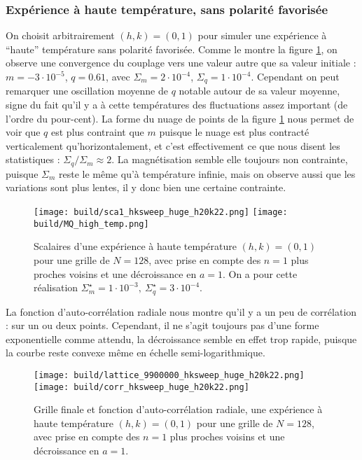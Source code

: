 \documentclass[a4paper, 11pt]{article}
\begin{document}
\subsubsection{Expérience à haute température, sans polarité favorisée }

On choisit arbitrairement $(h, k) = (0, 1)$ pour simuler une expérience à ``haute'' température sans
polarité favorisée. Comme le montre la figure \ref{fig:high_en_sca}, on observe une convergence du
couplage vers une valeur autre que sa valeur initiale : $m = -3\cdot10^{-5}$, $q=0.61$, avec $\Sigma_m
= 2\cdot10^{-4}$, $\Sigma_q = 1\cdot10^{-4}$. Cependant on peut remarquer une oscillation moyenne de $q$
notable autour de sa valeur moyenne, signe du fait qu'il y a à cette températures des fluctuations
assez important (de l'ordre du pour-cent). La forme du nuage de points de la figure
\ref{fig:high_en_sca} nous permet de voir que $q$ est plus contraint que $m$ puisque le nuage est
plus contracté verticalement qu'horizontalement, et c'est effectivement ce que nous disent les
statistiques : $\Sigma_q/ \Sigma_m \approx 2$. La magnétisation semble elle toujours non
contrainte, puisque $\Sigma_m$ reste le même qu'à température infinie, mais on observe aussi que les
variations sont plus lentes, il y donc bien une certaine contrainte. 


\begin{figure}
    \centering
    \texttt{[image: build/sca1\_hksweep\_huge\_h20k22.png]}
    \texttt{[image: build/MQ\_high\_temp.png]}
    \caption{Scalaires d'une expérience à haute température $(h, k) = (0, 1)$ pour une grille de
    $N=128$, avec prise en compte des $n=1$ plus proches voisins et une décroissance en $a=1$.  On a
    pour cette réalisation $\Sigma_m^\star = 1\cdot10^{-3},~ \Sigma_q^\star = 3\cdot10^{-4}$.}
    \label{fig:high_en_sca}
\end{figure}


La fonction d'auto-corrélation radiale nous montre qu'il y a un peu de corrélation : sur un ou deux
points. Cependant, il ne s'agit toujours pas d'une forme exponentielle comme attendu, la
décroissance semble en effet trop rapide, puisque la courbe reste convexe même en échelle
semi-logarithmique. 

\begin{figure}
    \centering
    \texttt{[image: build/lattice\_9900000\_hksweep\_huge\_h20k22.png]}
    \texttt{[image: build/corr\_hksweep\_huge\_h20k22.png]}
    \caption{Grille finale et fonction d'auto-corrélation radiale, une expérience à haute
    température $(h, k) = (0, 1)$ pour une grille de $N=128$, avec prise en compte des $n=1$ plus
    proches voisins et une décroissance en $a=1$.} 
    \label{fig:high_en_corr}
\end{figure}
\end{document}

